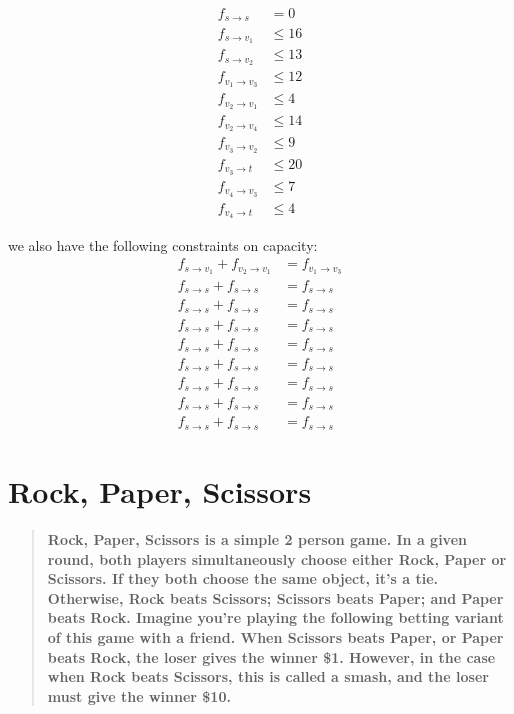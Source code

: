 \documentclass[titlepage]{article}\usepackage[]{graphicx}\usepackage[]{color}
\begin{document}
  \begin{equation}
    \begin{aligned}
      f_{s \to s} &= 0 \\
      f_{s \to v_1} &\leq 16  \\
      f_{s \to v_2} &\leq 13   \\
      f_{v_1 \to v_3} &\leq 12  \\
      f_{v_2 \to v_1} &\leq 4  \\
      f_{v_2 \to v_4} &\leq 14  \\
      f_{v_3 \to v_2} &\leq 9  \\
      f_{v_3 \to t} &\leq 20  \\
      f_{v_4 \to v_3} &\leq  7 \\
      f_{v_4 \to t} &\leq  4 
    \end{aligned}
  \end{equation}

  we also have the following constraints on capacity:
  \begin{equation}
    \begin{aligned}
      f_{s \to v_1} + f_{v_2 \to v_1} &=  f_{v_1 \to v_3} \\
      f_{s \to s} + f_{s \to s} &=  f_{s \to s} \\
      f_{s \to s} + f_{s \to s} &=  f_{s \to s} \\
      f_{s \to s} + f_{s \to s} &=  f_{s \to s} \\
      f_{s \to s} + f_{s \to s} &=  f_{s \to s} \\
      f_{s \to s} + f_{s \to s} &=  f_{s \to s} \\
      f_{s \to s} + f_{s \to s} &=  f_{s \to s} \\
      f_{s \to s} + f_{s \to s} &=  f_{s \to s} \\
      f_{s \to s} + f_{s \to s} &=  f_{s \to s}
    \end{aligned}
  \end{equation}

\section{Rock, Paper, Scissors}
  \begin{quote}
    \textbf{Rock, Paper, Scissors is a simple 2 person game. In a given round,
    both players simultaneously choose either Rock, Paper or Scissors. If they
    both choose the same object, it’s a tie. Otherwise, Rock beats Scissors;
    Scissors beats Paper; and Paper beats Rock. Imagine you’re playing the
    following betting variant of this game with a friend. When Scissors beats
    Paper, or Paper beats Rock, the loser gives the winner \$1. However, in the case
    when Rock beats Scissors, this is called a \textbf{smash}, and the loser must give the
    winner \$10.}
  \end{quote}
\end{document}
